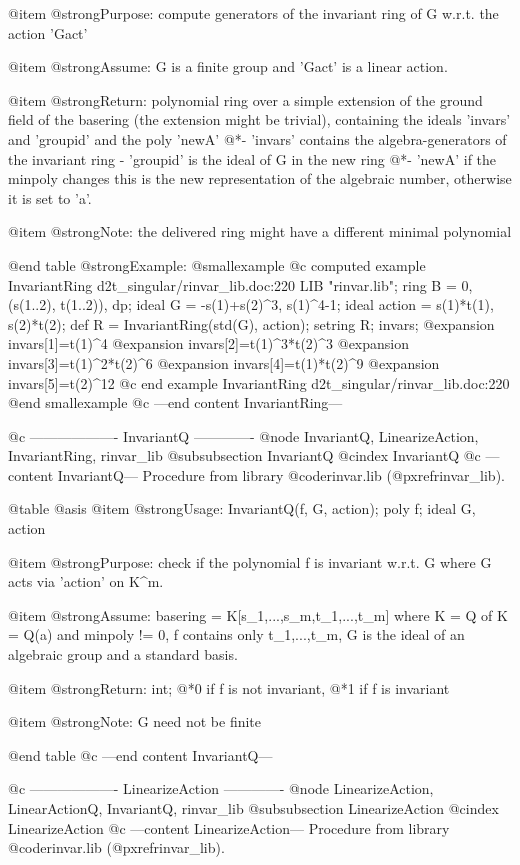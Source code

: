 @item @strong{Purpose:}
compute generators of the invariant ring of G w.r.t. the action 'Gact'

@item @strong{Assume:}
G is a finite group and 'Gact' is a linear action.

@item @strong{Return:}
polynomial ring over a simple extension of the ground field of the
basering (the extension might be trivial), containing the ideals
'invars' and 'groupid' and the poly 'newA'
@*- 'invars' contains the algebra-generators of the invariant ring
- 'groupid' is the ideal of G in the new ring
@*- 'newA' if the minpoly changes this is the new representation of the
algebraic number, otherwise it is set to 'a'.

@item @strong{Note:}
the delivered ring might have a different minimal polynomial

@end table
@strong{Example:}
@smallexample
@c computed example InvariantRing d2t_singular/rinvar_lib.doc:220 
LIB "rinvar.lib";
ring B = 0, (s(1..2), t(1..2)), dp;
ideal G = -s(1)+s(2)^3, s(1)^4-1;
ideal action = s(1)*t(1), s(2)*t(2);
def R = InvariantRing(std(G), action);
setring R;
invars;
@expansion{} invars[1]=t(1)^4
@expansion{} invars[2]=t(1)^3*t(2)^3
@expansion{} invars[3]=t(1)^2*t(2)^6
@expansion{} invars[4]=t(1)*t(2)^9
@expansion{} invars[5]=t(2)^12
@c end example InvariantRing d2t_singular/rinvar_lib.doc:220
@end smallexample
@c ---end content InvariantRing---

@c ------------------- InvariantQ -------------
@node InvariantQ, LinearizeAction, InvariantRing, rinvar_lib
@subsubsection InvariantQ
@cindex InvariantQ
@c ---content InvariantQ---
Procedure from library @code{rinvar.lib} (@pxref{rinvar_lib}).

@table @asis
@item @strong{Usage:}
InvariantQ(f, G, action); poly f; ideal G, action

@item @strong{Purpose:}
check if the polynomial f is invariant w.r.t. G where G acts via
'action' on K^m.

@item @strong{Assume:}
basering = K[s_1,...,s_m,t_1,...,t_m] where K = Q of K = Q(a) and
minpoly != 0, f contains only t_1,...,t_m, G is the ideal of an
algebraic group and a standard basis.

@item @strong{Return:}
int;
@*0 if f is not invariant,
@*1 if f is invariant

@item @strong{Note:}
G need not be finite

@end table
@c ---end content InvariantQ---

@c ------------------- LinearizeAction -------------
@node LinearizeAction, LinearActionQ, InvariantQ, rinvar_lib
@subsubsection LinearizeAction
@cindex LinearizeAction
@c ---content LinearizeAction---
Procedure from library @code{rinvar.lib} (@pxref{rinvar_lib}).

